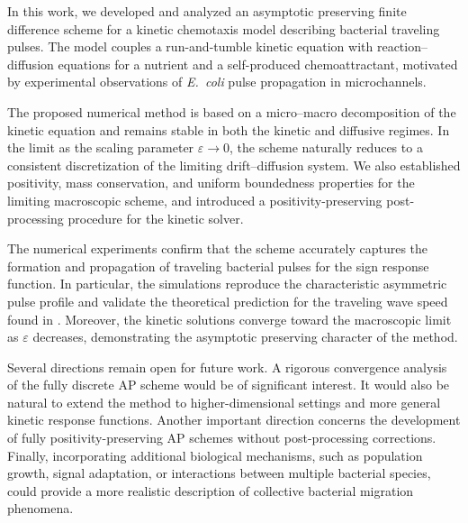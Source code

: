 \documentclass[11pt,twoside]{article}
\numberwithin{equation}{section}
\theoremstyle{plain}
\theoremstyle{nonumberplain}
\begin{document}
{In this work, we developed and analyzed an asymptotic preserving finite difference scheme for a kinetic chemotaxis model describing bacterial traveling pulses. The model couples a run-and-tumble kinetic equation with reaction--diffusion equations for a nutrient and a self-produced chemoattractant, motivated by experimental observations of \textit{E.~coli} pulse propagation in microchannels.

The proposed numerical method is based on a micro--macro decomposition of the kinetic equation and remains stable in both the kinetic and diffusive regimes. In the limit as the scaling parameter $\varepsilon \to 0$, the scheme naturally reduces to a consistent discretization of the limiting drift--diffusion system. We also established positivity, mass conservation, and uniform boundedness properties for the limiting macroscopic scheme, and introduced a positivity-preserving post-processing procedure for the kinetic solver.

The numerical experiments confirm that the scheme accurately captures the formation and propagation of traveling bacterial pulses for the sign response function. In particular, the simulations reproduce the characteristic asymmetric pulse profile and validate the theoretical prediction for the traveling wave speed found in \cite{calvez2019chemotactic}. Moreover, the kinetic solutions converge toward the macroscopic limit as $\varepsilon$ decreases, demonstrating the asymptotic preserving character of the method.

Several directions remain open for future work. A rigorous convergence analysis of the fully discrete AP scheme would be of significant interest. It would also be natural to extend the method to higher-dimensional settings and more general kinetic response functions. Another important direction concerns the development of fully positivity-preserving AP schemes without post-processing corrections. Finally, incorporating additional biological mechanisms, such as population growth, signal adaptation, or interactions between multiple bacterial species, could provide a more realistic description of collective bacterial migration phenomena.



}
\end{document}
